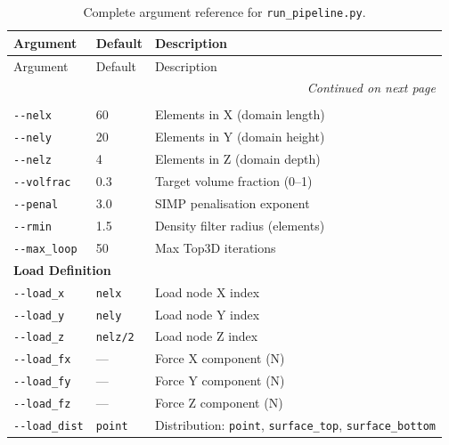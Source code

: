 \documentclass[a4paper, 11pt, openany]{report}
\begin{document}
\begin{longtable}{p{4cm}lp{6cm}}
\caption{Complete argument reference for \texttt{run\_pipeline.py}.}
\label{tab:cli-pipeline-args} \\
\toprule
Argument & Default & Description \\
\midrule
\endfirsthead
\toprule
Argument & Default & Description \\
\midrule
\endhead
\midrule
\multicolumn{3}{r}{\textit{Continued on next page}} \\
\bottomrule
\endfoot
\bottomrule
\endlastfoot

\multicolumn{3}{l}{\textbf{Top3D Design Domain}} \\
\midrule
\texttt{-{}-nelx}         & 60         & Elements in X (domain length) \\
\texttt{-{}-nely}         & 20         & Elements in Y (domain height) \\
\texttt{-{}-nelz}         & 4          & Elements in Z (domain depth) \\
\texttt{-{}-volfrac}      & 0.3        & Target volume fraction (0--1) \\
\texttt{-{}-penal}        & 3.0        & SIMP penalisation exponent \\
\texttt{-{}-rmin}         & 1.5        & Density filter radius (elements) \\
\texttt{-{}-max\_loop}    & 50         & Max Top3D iterations \\
\midrule

\multicolumn{3}{l}{\textbf{Load Definition}} \\
\midrule
\texttt{-{}-load\_x}      & \texttt{nelx}  & Load node X index \\
\texttt{-{}-load\_y}      & \texttt{nely}  & Load node Y index \\
\texttt{-{}-load\_z}      & \texttt{nelz/2}& Load node Z index \\
\texttt{-{}-load\_fx}     & ---            & Force X component (N) \\
\texttt{-{}-load\_fy}     & ---            & Force Y component (N) \\
\texttt{-{}-load\_fz}     & ---            & Force Z component (N) \\
\texttt{-{}-load\_dist}   & \texttt{point} & Distribution: \texttt{point}, \texttt{surface\_top}, \texttt{surface\_bottom} \\
\midrule


\end{longtable}
\end{document}
